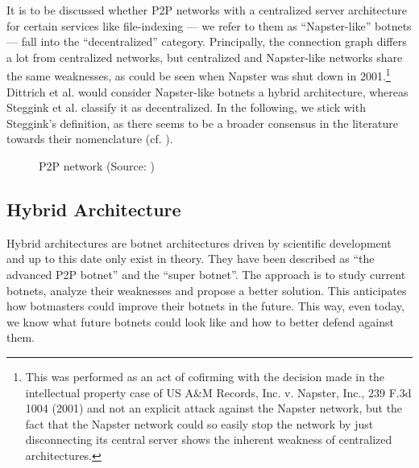 \documentclass{llncs}
\begin{document}
It is to be discussed whether P2P networks with a centralized server
architecture for certain services like file-indexing --- we refer to
them as ``Napster-like'' botnets --- fall into the ``decentralized''
category. Principally, the connection graph differs a lot from
centralized networks, but centralized and Napster-like networks share
the same weaknesses, as could be seen when Napster was shut down in
2001\cite{napsterWiki}.\footnote{This was performed as an act of
  cofirming with the decision made in the intellectual property case
  of US A&M Records, Inc. v. Napster, Inc., 239 F.3d 1004 (2001) and
  not an explicit attack against the Napster network, but the fact
  that the Napster network could so easily stop the network by just
  disconnecting its central server shows the inherent weakness of
  centralized architectures.}  Dittrich et
al. \cite{dittrich2007command} would consider Napster-like botnets a
hybrid architecture, whereas Steggink et al.
\cite{steggink2007detection} classify it as decentralized. In the
following, we stick with Steggink's definition, as there seems to be a
broader consensus in the literature towards their nomenclature
(cf. \cite{td1sc}).

\begin{figure}[htbp]
  \centering
  \caption{P2P network (Source: \cite{dittrich2007command})}
  \label{p2p-network}
\end{figure}


\subsection{Hybrid Architecture}
\label{hybrid}
Hybrid architectures are botnet architectures driven by scientific
development and up to this date only exist in theory. They have been
described as ``the advanced P2P botnet''\cite{td1sc} and the ``super
botnet''\cite{vogt2007army}. The approach is to study current botnets,
analyze their weaknesses and propose a better solution. This
anticipates how botmasters could improve their botnets in the
future. This way, even today, we know what future botnets could look
like and how to better defend against them.
\end{document}
